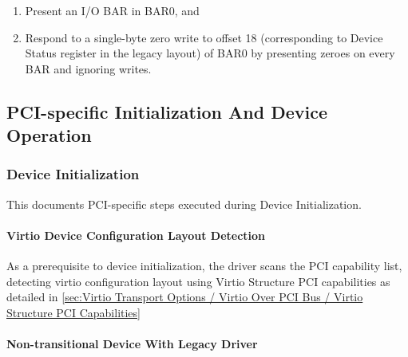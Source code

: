 \begin{enumerate}
\item Present an I/O BAR in BAR0, and
\item Respond to a single-byte zero write to offset 18
   (corresponding to Device Status register in the legacy layout)
   of BAR0 by presenting zeroes on every BAR and ignoring writes.
\end{enumerate}

\subsection{PCI-specific Initialization And Device Operation}\label{sec:Virtio Transport Options / Virtio Over PCI Bus / PCI-specific Initialization And Device Operation}

\subsubsection{Device Initialization}\label{sec:Virtio Transport Options / Virtio Over PCI Bus / PCI-specific Initialization And Device Operation / Device Initialization}

This documents PCI-specific steps executed during Device Initialization.

\paragraph{Virtio Device Configuration Layout Detection}\label{sec:Virtio Transport Options / Virtio Over PCI Bus / PCI-specific Initialization And Device Operation / Device Initialization / Virtio Device Configuration Layout Detection}

As a prerequisite to device initialization, the driver scans the
PCI capability list, detecting virtio configuration layout using Virtio
Structure PCI capabilities as detailed in \ref{sec:Virtio Transport Options / Virtio Over PCI Bus / Virtio Structure PCI Capabilities}

\paragraph{Non-transitional Device With Legacy Driver}\label{sec:Virtio Transport Options / Virtio Over PCI Bus / PCI-specific Initialization And Device Operation / Device Initialization / Non-transitional Device With Legacy Driver}


